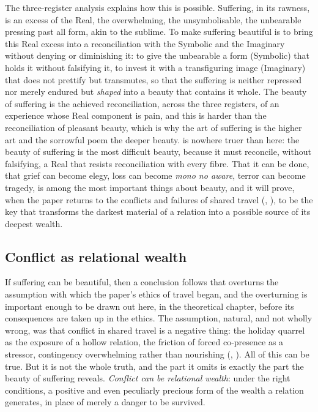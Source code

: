 The three-register analysis explains how this is possible. Suffering, in its rawness, is an excess of the Real, the overwhelming, the unsymbolisable, the unbearable pressing past all form, akin to the sublime. To make suffering beautiful is to bring this Real excess into a reconciliation with the Symbolic and the Imaginary without denying or diminishing it: to give the unbearable a form (Symbolic) that holds it without falsifying it, to invest it with a transfiguring image (Imaginary) that does not prettify but transmutes, so that the suffering is neither repressed nor merely endured but \emph{shaped} into a beauty that contains it whole. The beauty of suffering is the achieved reconciliation, across the three registers, of an experience whose Real component is pain, and this is harder than the reconciliation of pleasant beauty, which is why the art of suffering is the higher art and the sorrowful poem the deeper beauty.  is nowhere truer than here: the beauty of suffering is the most difficult beauty, because it must reconcile, without falsifying, a Real that resists reconciliation with every fibre. That it can be done, that grief can become elegy, loss can become \emph{mono no aware}, terror can become tragedy, is among the most important things about beauty, and it will prove, when the paper returns to the conflicts and failures of shared travel (, ), to be the key that transforms the darkest material of a relation into a possible source of its deepest wealth.

\subsection{Conflict as relational wealth}
\label{p21:sub:conflict-wealth}

If suffering can be beautiful, then a conclusion follows that overturns the assumption with which the paper's ethics of travel began, and the overturning is important enough to be drawn out here, in the theoretical chapter, before its consequences are taken up in the ethics. The assumption, natural, and not wholly wrong, was that conflict in shared travel is a negative thing: the holiday quarrel as the exposure of a hollow relation, the friction of forced co-presence as a stressor, contingency overwhelming rather than nourishing (, ). All of this can be true. But it is not the whole truth, and the part it omits is exactly the part the beauty of suffering reveals. \emph{Conflict can be relational wealth}: under the right conditions, a positive and even peculiarly precious form of the wealth a relation generates, in place of merely a danger to be survived.


